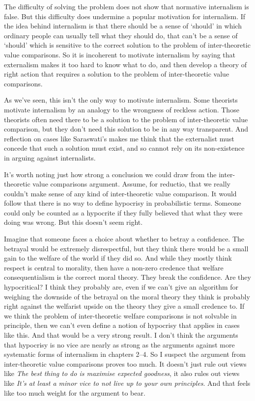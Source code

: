 The difficulty of solving the problem does not show that normative internalism is false. But this difficulty does undermine a popular motivation for internalism. If the idea behind internalism is that there should be a sense of `should' in which ordinary people can usually tell what they should do, that can't be a sense of `should' which is sensitive to the correct solution to the problem of inter-theoretic value comparisons. So it is incoherent to motivate internalism by saying that externalism makes it too hard to know what to do, and then develop a theory of right action that requires a solution to the problem of inter-theoretic value comparisons.

As we've seen, this isn't the only way to motivate internalism. Some theorists motivate internalism by an analogy to the wrongness of reckless action. Those theorists often need there to be a solution to the problem of inter-theoretic value comparison, but they don't need this solution to be in any way transparent. And reflection on cases like \gls{Saraswati}'s makes me think that the externalist must concede that such a solution must exist, and so cannot rely on its non-existence in arguing against internalists.

It's worth noting just how strong a conclusion we could draw from the inter-theoretic value comparisons argument. Assume, for reductio, that we really couldn't make sense of any kind of inter-theoretic value comparison. It would follow that there is no way to define hypocrisy in probabilistic terms. Someone could only be counted as a hypocrite if they fully believed that what they were doing was wrong. But this doesn't seem right.

Imagine that someone faces a choice about whether to betray a confidence. The betrayal would be extremely disrespectful, but they think there would be a small gain to the welfare of the world if they did so. And while they mostly think respect is central to morality, then have a non-zero credence that welfare consequentialism is the correct moral theory. They break the confidence. Are they hypocritical? I think they probably are, even if we can't give an algorithm for weighing the downside of the betrayal on the moral theory they think is probably right against the welfarist upside on the theory they give a small credence to. If we think the problem of inter-theoretic welfare comparisons is not solvable in principle, then we can't even define a notion of hypocrisy that applies in cases like this. And that would be a very strong result. I don't think the arguments that hypocrisy is no vice are nearly as strong as the arguments against more systematic forms of internalism in chapters 2--4. So I suspect the argument from inter-theoretic value comparisons proves too much. It doesn't just rule out views like \emph{The best thing to do is maximise expected goodness}, it also rules out views like \emph{It's at least a minor vice to not live up to your own principles}. And that feels like too much weight for the argument to bear.


